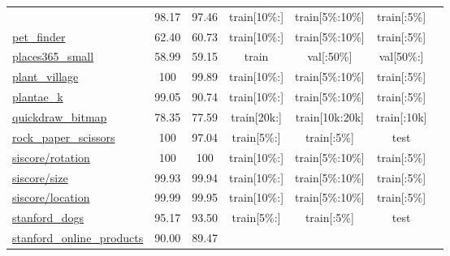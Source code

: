 \documentclass{article} \usepackage{iclr2023_conference,times}
\begin{document}
\begin{table*}[h]
\begin{tabular}{lcccccc}
&  98.17  &  97.46
 & train[{\tiny10\%:}] & train[{\tiny5\%:10\%}] & train[{\tiny:5\%}] &
 \citep{Rajaraman2018PretrainedCN}
 \\
\href{https://www.tensorflow.org/datasets/catalog/pet_finder}{pet\_finder}
&  62.40  &  60.73
 & train[{\tiny10\%:}] & train[{\tiny5\%:10\%}] & train[{\tiny:5\%}] &
  \\
\href{https://www.tensorflow.org/datasets/catalog/places365_small}{places365\_small}
&  58.99  &  59.15
 & train & val[{\tiny:50\%}] & val[{\tiny50\%:}] &
 \citep{Zhou2018PlacesA1}
 \\
\href{https://www.tensorflow.org/datasets/catalog/plant_village}{plant\_village}
&  100  &  99.89
 & train[{\tiny10\%:}] & train[{\tiny5\%:10\%}] & train[{\tiny:5\%}] &
 \citep{Hughes2015AnOA}
 \\
\href{https://www.tensorflow.org/datasets/catalog/plantae_k}{plantae\_k}
&  99.05  &  90.74
 & train[{\tiny10\%:}] & train[{\tiny5\%:10\%}] & train[{\tiny:5\%}] &
 \citep{Kour2019PlantaeKAL}
 \\
\href{https://www.tensorflow.org/datasets/catalog/quickdraw_bitmap}{quickdraw\_bitmap}
&  78.35  &  77.59
 & train[{\tiny20k:}] & train[{\tiny10k:20k}] & train[{\tiny:10k}] & 
 \citep{Ha2018ANR}
 \\
\href{https://www.tensorflow.org/datasets/catalog/rock_paper_scissors}{rock\_paper\_scissors}
&  100  &  97.04
 & train[{\tiny5\%:}] & train[{\tiny:5\%}] & test &
 \citep{rps}
 \\
\href{https://www.tensorflow.org/datasets/catalog/siscore#rotation}{siscore/rotation}
&  100  &  100
 & train[{\tiny10\%:}] & train[{\tiny5\%:10\%}] & train[{\tiny:5\%}] &
 \citep{Djolonga2021OnRA}
 \\
\href{https://www.tensorflow.org/datasets/catalog/siscore#size}{siscore/size}
&  99.93  &  99.94
 & train[{\tiny10\%:}] & train[{\tiny5\%:10\%}] & train[{\tiny:5\%}] &
 \citep{Djolonga2021OnRA}
 \\
\href{https://www.tensorflow.org/datasets/catalog/siscore#location}{siscore/location}
&  99.99  &  99.95
 & train[{\tiny10\%:}] & train[{\tiny5\%:10\%}] & train[{\tiny:5\%}] &
 \citep{Djolonga2021OnRA}
 \\
\href{https://www.tensorflow.org/datasets/catalog/stanford_dogs}{stanford\_dogs}
&  95.17  &  93.50
 & train[{\tiny5\%:}] & train[{\tiny:5\%}] & test &
 \citep{Khosla2012NovelDF}
 \\
\href{https://www.tensorflow.org/datasets/catalog/stanford_online_products}{stanford\_online\_products} &  90.00  &  89.47

\end{tabular}
\end{table*}
\end{document}
